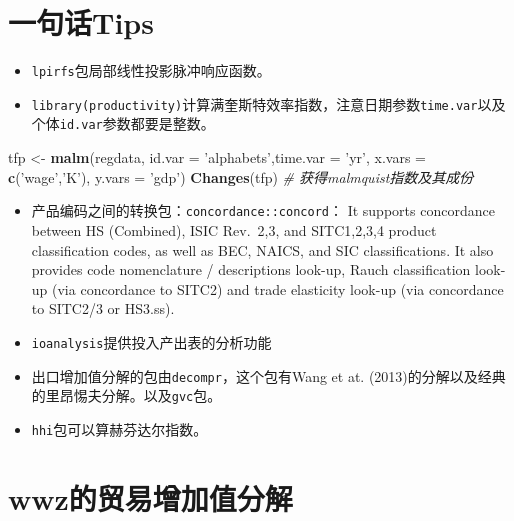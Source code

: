 \documentclass[
]{book}
\newenvironment{Shaded}{\begin{snugshade}}{\end{snugshade}}
\newcommand{\CommentTok}[1]{\textcolor[rgb]{0.56,0.35,0.01}{\textit{#1}}}
\newcommand{\DataTypeTok}[1]{\textcolor[rgb]{0.13,0.29,0.53}{#1}}
\newcommand{\KeywordTok}[1]{\textcolor[rgb]{0.13,0.29,0.53}{\textbf{#1}}}
\newcommand{\NormalTok}[1]{#1}
\newcommand{\StringTok}[1]{\textcolor[rgb]{0.31,0.60,0.02}{#1}}
\providecommand{\tightlist}{%
  \setlength{\itemsep}{0pt}\setlength{\parskip}{0pt}}
\begin{document}
\hypertarget{ux4e00ux53e5ux8bddtips-5}{%
\section{一句话Tips}\label{ux4e00ux53e5ux8bddtips-5}}

\begin{itemize}
\tightlist
\item
  \texttt{lpirfs}包局部线性投影脉冲响应函数。
\item
  \texttt{library(productivity)}计算满奎斯特效率指数，注意日期参数\texttt{time.var}以及个体\texttt{id.var}参数都要是整数。
\end{itemize}

\begin{Shaded}
\begin{Highlighting}[]
\NormalTok{tfp <-}\StringTok{ }\KeywordTok{malm}\NormalTok{(regdata, }\DataTypeTok{id.var =} \StringTok{'alphabets'}\NormalTok{,}\DataTypeTok{time.var =} \StringTok{'yr'}\NormalTok{, }\DataTypeTok{x.vars =} \KeywordTok{c}\NormalTok{(}\StringTok{'wage'}\NormalTok{,}\StringTok{'K'}\NormalTok{), }\DataTypeTok{y.vars =} \StringTok{'gdp'}\NormalTok{)}
\KeywordTok{Changes}\NormalTok{(tfp) }\CommentTok{# 获得malmquist指数及其成份}
\end{Highlighting}
\end{Shaded}

\begin{itemize}
\tightlist
\item
  产品编码之间的转换包：\texttt{concordance::concord}：
  It supports concordance between HS (Combined), ISIC Rev.~2,3, and SITC1,2,3,4 product classification codes, as well as BEC, NAICS, and SIC classifications. It also provides code nomenclature / descriptions look-up, Rauch classification look-up (via concordance to SITC2) and trade elasticity look-up (via concordance to SITC2/3 or HS3.ss).
\item
  \texttt{ioanalysis}提供投入产出表的分析功能
\item
  出口增加值分解的包由\texttt{decompr}，这个包有Wang et at. (2013)的分解以及经典的里昂惕夫分解。以及\texttt{gvc}包。
\item
  \texttt{hhi}包可以算赫芬达尔指数。
\end{itemize}

\hypertarget{wwzux7684ux8d38ux6613ux589eux52a0ux503cux5206ux89e3}{%
\section{wwz的贸易增加值分解}\label{wwzux7684ux8d38ux6613ux589eux52a0ux503cux5206ux89e3}}
\end{document}
